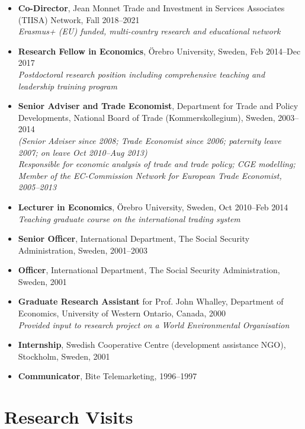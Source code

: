 \documentclass[11pt,a4paper]{article}
\newcommand{\cventry}[1]{\item #1}
\begin{document}
\begin{itemize}
  \cventry{\textbf{Co-Director}, Jean Monnet Trade and Investment in Services Associates (TIISA) Network, Fall 2018--2021\\
  \textit{Erasmus+ (EU) funded, multi-country research and educational network}}

  \cventry{\textbf{Research Fellow in Economics}, Örebro University, Sweden, Feb 2014--Dec 2017\\
  \textit{Postdoctoral research position including comprehensive teaching and leadership training program}}

  \cventry{\textbf{Senior Adviser and Trade Economist}, Department for Trade and Policy Developments, National Board of Trade (Kommerskollegium), Sweden, 2003--2014\\
  \textit{(Senior Adviser since 2008; Trade Economist since 2006; paternity leave 2007; on leave Oct 2010--Aug 2013)}\\
  \textit{Responsible for economic analysis of trade and trade policy; CGE modelling; Member of the EC-Commission Network for European Trade Economist, 2005--2013}}

  \cventry{\textbf{Lecturer in Economics}, Örebro University, Sweden, Oct 2010--Feb 2014\\
  \textit{Teaching graduate course on the international trading system}}

  \cventry{\textbf{Senior Officer}, International Department, The Social Security Administration, Sweden, 2001--2003}

  \cventry{\textbf{Officer}, International Department, The Social Security Administration, Sweden, 2001}

  \cventry{\textbf{Graduate Research Assistant} for Prof. John Whalley, Department of Economics, University of Western Ontario, Canada, 2000\\
  \textit{Provided input to research project on a World Environmental Organisation}}

  \cventry{\textbf{Internship}, Swedish Cooperative Centre (development assistance NGO), Stockholm, Sweden, 2001}

  \cventry{\textbf{Communicator}, Bite Telemarketing, 1996--1997}
\end{itemize}

\section{Research Visits}
\end{document}
